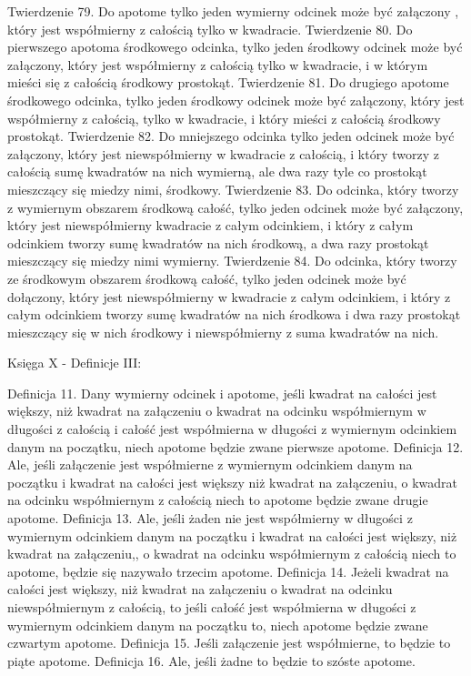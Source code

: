     Twierdzenie 79.
        Do apotome tylko jeden wymierny odcinek może być załączony , który jest współmierny z całością tylko w kwadracie.
    Twierdzenie 80.
        Do pierwszego apotoma środkowego odcinka, tylko jeden środkowy odcinek może być załączony, który jest współmierny z całością tylko w kwadracie, i w którym mieści się z całością środkowy prostokąt.
    Twierdzenie 81.
        Do drugiego apotome środkowego odcinka, tylko jeden środkowy odcinek może być załączony, który jest współmierny z całością, tylko w kwadracie, i który mieści z całością środkowy prostokąt.
    Twierdzenie 82.
        Do mniejszego odcinka tylko jeden odcinek może być załączony, który jest niewspółmierny w kwadracie z całością, i który tworzy z całością sumę kwadratów na nich wymierną, ale dwa razy tyle co prostokąt mieszczący się miedzy nimi, środkowy.
    Twierdzenie 83.
        Do odcinka, który tworzy z wymiernym obszarem środkową całość, tylko jeden odcinek może być załączony, który jest niewspółmierny kwadracie z całym odcinkiem, i który z całym odcinkiem tworzy sumę kwadratów na nich środkową, a dwa razy prostokąt mieszczący się miedzy nimi wymierny.
    Twierdzenie 84.
        Do odcinka, który tworzy ze środkowym obszarem środkową całość, tylko jeden odcinek może być dołączony, który jest niewspółmierny w kwadracie z całym odcinkiem, i który z całym odcinkiem tworzy sumę kwadratów na nich środkowa i dwa razy prostokąt mieszczący się w nich środkowy i niewspółmierny z suma kwadratów na nich.
    
    
    Księga X - Definicje III:
    
    Definicja 11.
        Dany wymierny odcinek i apotome, jeśli kwadrat na całości jest większy, niż kwadrat na załączeniu o kwadrat na odcinku współmiernym w długości z całością i całość jest współmierna w długości z wymiernym odcinkiem danym na początku, niech apotome będzie zwane pierwsze apotome.
    Definicja 12.
        Ale, jeśli załączenie jest współmierne z wymiernym odcinkiem danym na początku i kwadrat na całości jest większy niż kwadrat na załączeniu, o kwadrat na odcinku współmiernym z całością niech to apotome będzie zwane drugie apotome.
    Definicja 13.
        Ale, jeśli żaden nie jest współmierny w długości z wymiernym odcinkiem danym na początku i kwadrat na całości jest większy, niż kwadrat na załączeniu,, o kwadrat na odcinku współmiernym z całością niech to apotome, będzie się nazywało trzecim apotome.
    Definicja 14.
        Jeżeli kwadrat na całości jest większy, niż kwadrat na załączeniu o kwadrat na odcinku niewspółmiernym z całością, to jeśli całość jest współmierna w długości z wymiernym odcinkiem danym na początku to, niech apotome będzie zwane czwartym apotome.
    Definicja 15.
        Jeśli załączenie jest współmierne, to będzie to piąte apotome. 
    Definicja 16.
        Ale, jeśli żadne to będzie to szóste apotome.
    
